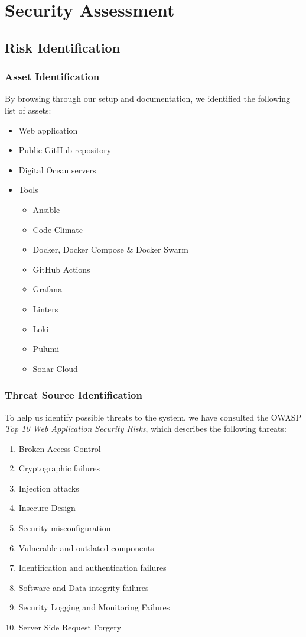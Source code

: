 \section{Security Assessment}
\label{appendix:securityassesment}
\subsection{Risk Identification}
\subsubsection{Asset Identification}
By browsing through our setup and documentation, we identified the following list of assets:
\begin{itemize}
    \item Web application
    \item Public GitHub repository
    \item Digital Ocean servers
    \item Tools
    \begin{itemize}
        \item Ansible
        \item Code Climate
        \item Docker, Docker Compose \& Docker Swarm
        \item GitHub Actions
        \item Grafana
        \item Linters
        \item Loki
        \item Pulumi
        \item Sonar Cloud
    \end{itemize}
\end{itemize}
\subsubsection{Threat Source Identification}
To help us identify possible threats to the system, we have consulted the OWASP \textit{Top 10 Web Application Security Risks}\cite*{OWASP}, which describes the following threats:
\begin{enumerate}
    \item Broken Access Control
    \item Cryptographic failures
    \item Injection attacks
    \item Insecure Design
    \item Security misconfiguration
    \item Vulnerable and outdated components
    \item Identification and authentication failures
    \item Software and Data integrity failures
    \item Security Logging and Monitoring Failures
    \item Server Side Request Forgery
\end{enumerate}
